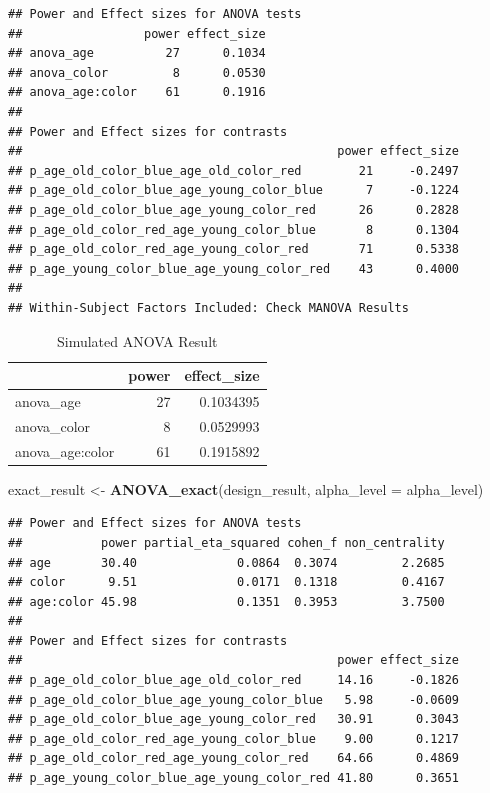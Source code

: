 \documentclass[]{book}
\newenvironment{Shaded}{\begin{snugshade}}{\end{snugshade}}
\newcommand{\DataTypeTok}[1]{\textcolor[rgb]{0.13,0.29,0.53}{#1}}
\newcommand{\KeywordTok}[1]{\textcolor[rgb]{0.13,0.29,0.53}{\textbf{#1}}}
\newcommand{\NormalTok}[1]{#1}
\newcommand{\StringTok}[1]{\textcolor[rgb]{0.31,0.60,0.02}{#1}}
\begin{document}
\begin{verbatim}
## Power and Effect sizes for ANOVA tests
##                 power effect_size
## anova_age          27      0.1034
## anova_color         8      0.0530
## anova_age:color    61      0.1916
## 
## Power and Effect sizes for contrasts
##                                            power effect_size
## p_age_old_color_blue_age_old_color_red        21     -0.2497
## p_age_old_color_blue_age_young_color_blue      7     -0.1224
## p_age_old_color_blue_age_young_color_red      26      0.2828
## p_age_old_color_red_age_young_color_blue       8      0.1304
## p_age_old_color_red_age_young_color_red       71      0.5338
## p_age_young_color_blue_age_young_color_red    43      0.4000
## 
## Within-Subject Factors Included: Check MANOVA Results
\end{verbatim}

\begin{table}[t]

\caption{\label{tab:unnamed-chunk-120}Simulated ANOVA Result}
\centering
\begin{tabular}{l|r|r}
\hline
  & power & effect\_size\\
\hline
anova\_age & 27 & 0.1034395\\
\hline
anova\_color & 8 & 0.0529993\\
\hline
anova\_age:color & 61 & 0.1915892\\
\hline
\end{tabular}
\end{table}

\begin{Shaded}
\begin{Highlighting}[]
\NormalTok{exact_result <-}\StringTok{ }\KeywordTok{ANOVA_exact}\NormalTok{(design_result, }\DataTypeTok{alpha_level =}\NormalTok{ alpha_level)}
\end{Highlighting}
\end{Shaded}

\begin{verbatim}
## Power and Effect sizes for ANOVA tests
##           power partial_eta_squared cohen_f non_centrality
## age       30.40              0.0864  0.3074         2.2685
## color      9.51              0.0171  0.1318         0.4167
## age:color 45.98              0.1351  0.3953         3.7500
## 
## Power and Effect sizes for contrasts
##                                            power effect_size
## p_age_old_color_blue_age_old_color_red     14.16     -0.1826
## p_age_old_color_blue_age_young_color_blue   5.98     -0.0609
## p_age_old_color_blue_age_young_color_red   30.91      0.3043
## p_age_old_color_red_age_young_color_blue    9.00      0.1217
## p_age_old_color_red_age_young_color_red    64.66      0.4869
## p_age_young_color_blue_age_young_color_red 41.80      0.3651
\end{verbatim}
\end{document}
